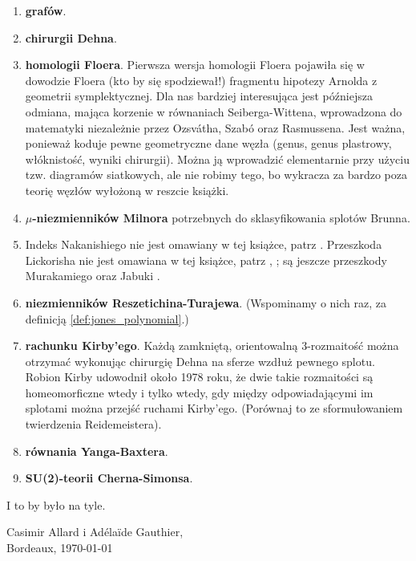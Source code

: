 \begin{enumerate}
    \item \textbf{grafów}. \cite[s. 18]{zieschang2014}
    \item \textbf{chirurgii Dehna}.
    \item \textbf{homologii Floera}.
    Pierwsza wersja homologii Floera pojawiła się w dowodzie Floera (kto by się spodziewał!) fragmentu hipotezy Arnolda z geometrii symplektycznej.
    Dla nas bardziej interesująca jest późniejsza odmiana, mająca korzenie w równaniach Seiberga-Wittena, wprowadzona do matematyki niezależnie przez Ozsvátha, Szabó oraz Rasmussena.
    Jest ważna, ponieważ koduje pewne geometryczne dane węzła (genus, genus plastrowy, włóknistość, wyniki chirurgii).
    Można ją wprowadzić elementarnie przy użyciu tzw. diagramów siatkowych, ale nie robimy tego, bo wykracza za bardzo poza teorię węzłów wyłożoną w reszcie książki.
    \item \textbf{$\mu$-niezmienników Milnora} potrzebnych do sklasyfikowania splotów Brunna.
    \item Indeks Nakanishiego nie jest omawiany w tej książce, patrz \cite{nakanishi1981}.
    Przeszkoda Lickorisha nie jest omawiana w tej książce, patrz \cite{cochran1986}, \cite{lickorish1985}; są jeszcze przeszkody Murakamiego \cite{murakami1990} oraz Jabuki \cite{jabuka2010}.
    \item \textbf{niezmienników Reszetichina-Turajewa}.
    (Wspominamy o nich raz, za definicją \ref{def:jones_polynomial}.)
    \item \textbf{rachunku Kirby'ego}.
    Każdą zamkniętą, orientowalną 3-rozmaitość można otrzymać wykonując chirurgię Dehna na sferze wzdłuż pewnego splotu. Robion Kirby udowodnił około 1978 roku, że dwie takie rozmaitości są homeomorficzne wtedy i tylko wtedy, gdy między odpowiadającymi im splotami można przejść ruchami Kirby'ego.
    (Porównaj to ze sformułowaniem twierdzenia Reidemeistera).
    \item \textbf{równania Yanga-Baxtera}. 
    \item \textbf{SU(2)-teorii Cherna-Simonsa}.
\end{enumerate}
I to by było na tyle.
\begin{flushright}
    Casimir Allard i Adélaïde Gauthier,\\Bordeaux, \today
\end{flushright}

